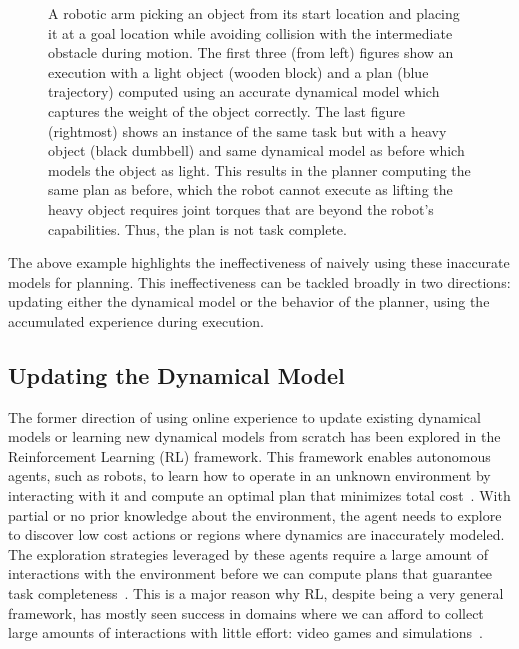 \begin{figure}[t]
\begin{subfigure}{0.24\linewidth}
  \end{subfigure}
  \caption{A robotic arm picking an object from its start location and
  placing it at a goal location while avoiding collision with the
  intermediate obstacle during motion. The first three (from left)
  figures show an execution with a light object (wooden block) and a
  plan (blue trajectory) computed
  using an accurate dynamical model which captures the weight of the
  object correctly. The last figure (rightmost) shows an instance of
  the same task but with a heavy object (black dumbbell) and same
  dynamical model as before which models the object as light. This
  results in the planner computing the same plan as before, which the
  robot cannot execute as lifting the heavy object requires joint
  torques that are beyond the robot's capabilities. Thus, the plan is
  not task complete.}
  \label{fig:intro-example}
\end{figure}
The above example highlights the ineffectiveness of naively using
these inaccurate models for planning. This ineffectiveness can be
tackled broadly in two directions: updating either the dynamical
model or the behavior of the planner, using the accumulated
experience during execution.

\subsection{Updating the Dynamical Model}
\label{sec:updat-dynam-model-1}

The former direction of using online
experience to update existing dynamical models or learning new
dynamical models from scratch has been explored in the Reinforcement
Learning (RL) framework. This framework enables autonomous agents,
such as robots, to learn how to operate in an unknown environment by
interacting with it and compute an optimal plan that minimizes total
cost~\cite{sutton1998introduction}. With partial or no prior knowledge
about the environment, the agent needs to explore to discover low cost
actions or regions where dynamics are inaccurately modeled. The
exploration strategies leveraged by these agents require a large
amount of interactions with the environment before we can compute
plans that guarantee task completeness~\cite{kakade2003sample}. This is a major reason why RL,
despite being a very general framework, has mostly seen success in
domains where we can afford to collect large amounts of interactions
with little effort: video games and
simulations~\cite{DBLP:journals/nature/SilverSSAHGHBLB17,
  DBLP:journals/corr/abs-1912-06680, DBLP:conf/aaai/HesselMHSODHPAS18}.

